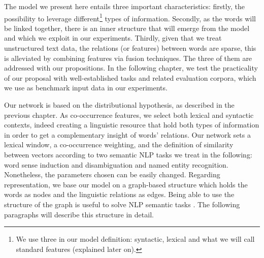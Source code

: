 The model we present here entails three  important characteristics: firstly, the possibility to leverage different\footnote{We use three in our model definition: syntactic, lexical  and what we will call standard features (explained later on).} types of information.  Secondly, as the words will be linked together, there is an inner structure that will emerge from the model and which we exploit in our experiments. Thirdly, given that we treat unstructured text data, the relations (or features)  between words are sparse, this is alleviated by combining features via fusion techniques.  The three of them are addressed with our propositions. 
In the following chapter, we test the practicality of our proposal with well-established tasks and related evaluation corpora, which we use as benchmark input data in our experiments. 

Our network is based on the distributional hypothesis, as described in the previous chapter.  As co-occurrence features, we select both lexical and syntactic contexts, indeed creating a linguistic resource that hold both types of information in order to get a complementary insight of words' relations. Our network sets a lexical window, a co-occurrence weighting, and the definition of similarity between vectors according to two semantic NLP tasks we treat in the following: word sense induction and disambiguation and named entity recognition. Nonetheless, the parameters chosen can be easily changed. Regarding representation, we base our model on a graph-based structure which holds the words as nodes and the linguistic relations as edges. Being able to use the structure of the graph is useful to solve NLP semantic tasks \cite{nastase2015survey}. The following paragraphs will describe this structure in detail.   
%





